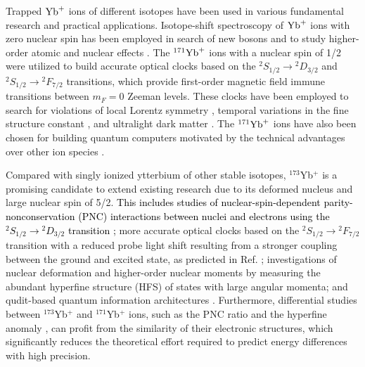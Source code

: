 \documentclass[
reprint,
superscriptaddress,









amsmath,amssymb,
aps,prl






]{revtex4-2}
\newcommand{\m}[1]{\textcolor{black}{#1}}
\begin{document}
\maketitle



Trapped $\rm{Yb}^+$ ions of different isotopes have been used in various fundamental research and practical applications. Isotope-shift spectroscopy of $\rm{Yb}^+$ ions with zero nuclear spin has been employed in search of new bosons and to study higher-order atomic and nuclear effects \cite{Counts2020,Hur2022,Door2025}. The $^{171}\rm{Yb}^+$ ions with a nuclear spin of 1/2 were utilized to build accurate optical clocks based on the $^2\!S_{1/2} \rightarrow {}^2\!D_{3/2}$ \cite{Tamm2014, STUHLER2021} and ${}^2\!S_{1/2} \rightarrow {}^2\!F_{7/2}$
\cite{Huntemann2016,Tofful2024} transitions, which provide first-order magnetic field immune transitions between $m_F=0$ Zeeman levels. These clocks have been employed to search for violations of local Lorentz symmetry \cite{Sanner2019}, temporal variations in the fine structure constant \cite{Lange2021}, and ultralight dark matter \cite{Filzinger2023}. The $^{171}\rm{Yb}^+$ ions have also been chosen for building quantum computers motivated by the technical advantages over other ion species \cite{Nop2021, Wright2019}.

Compared with singly ionized ytterbium of other stable isotopes,
$^{173}$Yb$^+$ is a promising candidate to extend existing research due to its deformed nucleus and large nuclear spin of 5/2.
\m{This includes studies of nuclear-spin-dependent parity-nonconservation (PNC) interactions between nuclei and electrons using the $^2\!S_{1/2}\rightarrow {}^{2}\!D_{3/2}$ transition \cite{Dzuba2011};} more accurate optical clocks based on the $^2\!S_{1/2} \rightarrow {}^2\!F_{7/2}$ transition with a reduced probe light shift resulting from a stronger coupling between the ground and excited state, as predicted in Ref. \cite{Dzuba2016}; investigations of nuclear deformation and higher-order nuclear moments by measuring the abundant hyperfine structure (HFS) of states with large angular momenta\cite{Xiao2020}; and qudit-based quantum information architectures \cite{Allcock2021,Jain2024}. Furthermore, differential studies between $^{173}$Yb$^+$ and $^{171}$Yb$^+$ ions, such as the PNC ratio \cite{Sahoo2011, Dzuba2011} and the hyperfine anomaly \cite{Roberts2021}, can profit from the similarity of their electronic structures, which significantly reduces the theoretical effort required to predict energy differences with high precision.
\end{document}
